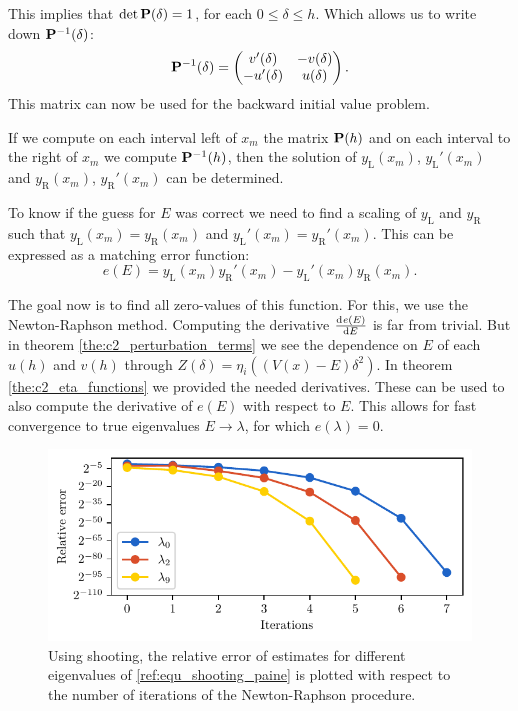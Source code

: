 This implies that $\det\vb{P}(\delta) = 1$, for each $0\leq \delta\leq h$. Which allows us to write down $\vb{P}^{-1}(\delta)$:
$$
    \vb{P}^{-1}(\delta) = \begin{pmatrix} v'(\delta) & -v(\delta) \\ -u'(\delta) & u(\delta) \end{pmatrix}\text{.}
$$
This matrix can now be used for the backward initial value problem.

If we compute on each interval left of $x_m$ the matrix $\vb{P}(h)$ and on each interval to the right of $x_m$ we compute $\vb{P}^{-1}(h)$, then the solution of $y_\text{L}(x_m)$, $y_\text{L}'(x_m)$ and $y_\text{R}(x_m)$, $y_\text{R}'(x_m)$ can be determined.

To know if the guess for $E$ was correct we need to find a scaling of $y_\text{L}$ and $y_\text{R}$ such that $y_\text{L}(x_m) = y_\text{R}(x_m)$ and $y_\text{L}'(x_m) = y_\text{R}'(x_m)$. This can be expressed as a matching error function:
\begin{equation}\label{equ:c2_matching_error}
    e(E) = y_\text{L}(x_m) y_\text{R}'(x_m) - y_\text{L}'(x_m) y_\text{R}(x_m)\text{.}
\end{equation}

The goal now is to find all zero-values of this function. For this, we use the Newton-Raphson method. Computing the derivative $\dv[]{e(E)}{E}$ is far from trivial. But in theorem \ref{the:c2_perturbation_terms} we see the dependence on $E$ of each $u(h)$ and $v(h)$ through $Z(\delta) = \eta_i\left((V(x) - E)\delta^2\right)$. In theorem \ref{the:c2_eta_functions} we provided the needed derivatives. These can be used to also compute the derivative of $e(E)$ with respect to $E$. This allows for fast convergence to true eigenvalues $E \to \lambda$, for which $e(\lambda) = 0$.

\begin{figure}
    \begin{center}
        \includegraphics[width=\textwidth]{img/chapter2/prufer/shooting_convergence_float128.pdf}
    \end{center}
    \caption{Using shooting, the relative error of estimates for different eigenvalues of \eqref{ref:equ_shooting_paine} is plotted with respect to the number of iterations of the Newton-Raphson procedure.}\label{fig:c2_shooting_convergence}
\end{figure}


